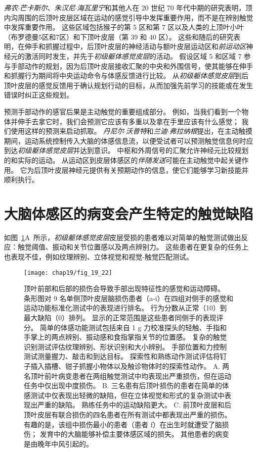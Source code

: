 \textit{弗农$\cdot$芒卡斯尔}、\textit{朱汉尼$\cdot$海瓦里宁}和其他人在 20 世纪 70 年代中期的研究表明，顶内沟周围的后顶叶皮层区域在运动的感觉引导中发挥重要作用，而不是在辨别触觉中发挥重要作用。
这些区域包括猴子的第 5 区和第 7 区以及人类的上顶叶小叶（布罗德曼5区和7区）和下顶叶皮层（第 39 和 40 区）。
这些和随后的研究表明，在伸手和抓握过程中，后顶叶皮层的神经活动与额叶皮层运动区和\textit{前运动区}神经元的激活同时发生，并先于\textit{初级躯体感觉皮层}的活动。
假设区域 5 和区域 7 参与手部动作的规划，因为后顶叶皮层接收汇聚的中央和外围信号，使其能够在伸手和抓握行为期间将中央运动命令与体感反馈进行比较。
从\textit{初级躯体感觉皮层}到后顶叶皮层的感觉反馈用于确认规划行动的目标，从而加强先前学习的技能或在发生错误时纠正这些规划。


预测手部动作的感官后果是主动触觉的重要组成部分。
例如，当我们看到一个物体并伸手去拿它时，我们会预测它应该有多重以及拿在手里应该有什么感觉；
我们使用这样的预测来启动抓取。
\textit{丹尼尔$\cdot$沃普特}和\textit{兰迪$\cdot$弗拉纳根}提出，在主动触摸期间，运动系统控制传入大脑的体感信息流，以便受试者可以预测触觉信息何时应到达\textit{初级躯体感觉皮层}并达到意识。 
中枢和外周信号的汇聚允许神经元比较规划的和实际的运动。
从运动区到皮层体感区的\textit{伴随发送}可能在主动触觉中起关键作用。
它为后顶叶皮层神经元提供有关预期动作的信息，使它们能够学习新技能并顺利执行。



\section{大脑体感区的病变会产生特定的触觉缺陷}

如图~\ref{fig:19_22}A~所示，\textit{初级躯体感觉皮层}皮层受损的患者难以对简单的触觉测试做出反应：触觉阈值、振动和关节位置感以及两点辨别力。
这些患者在更复杂的任务上也表现不佳，例如纹理辨别、立体视觉和视觉-触觉匹配测试。


\begin{figure}[htbp]
	\centering
	\texttt{[image: chap19/fig\_19\_22]}
	\caption{顶叶前部和后部的损伤会导致手部出现特征性的感觉和运动障碍。
		条形图对 9 名单侧顶叶皮层脑损伤患者（a-i）在四组对侧手的感觉和运动功能标准化测试中的表现进行排名。
		行为分数从正常（10）到最大缺陷（0）排列。
		显示的正常范围是这些患者同侧手的表现评分。
		简单的体感功能测试包括来自 1 g 力校准探头的轻触、手指和手掌上的两点辨别、振动感和食指掌指关节的位置感。
		复杂的触觉识别测试评估纹理辨别、形状识别和大小辨别。
		手部位置和力控制测试测量握力、敲击和到达目标。
		探索性和熟练动作测试评估将钉子插入插槽、钳子抓握小物体以及触诊物体时的探索性动作\cite{pause1989sensorimotor}。
		A. 两名顶叶前叶病变患者在两组触觉测试中均表现出严重损伤，但在运动任务中仅出现中度损伤。
		B. 三名患有后顶叶损伤的患者在简单的体感测试中仅表现出轻微的缺陷，但在立体视觉和形式的复杂测试中表现出严重的缺陷。
		熟练任务中的运动缺陷更大。
		C. 前顶叶皮层和后顶叶皮层有联合损伤的四名患者在所有测试中都表现出严重的损伤。
		有趣的是，该组中损伤最小的患者（患者 f）在出生时就遭受了脑损伤；
		发育中的大脑能够补偿主要体感区域的损失。
		其他患者的病变是由晚年中风引起的。}
	\label{fig:19_22}
\end{figure}


